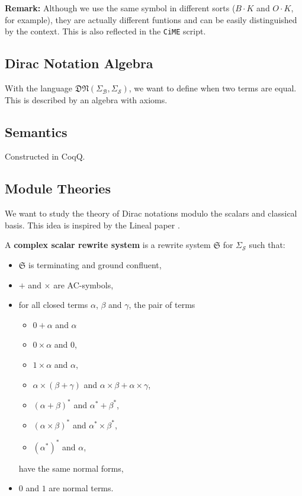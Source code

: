 \textbf{Remark: } Although we use the same symbol in different sorts ($B \cdot K$ and $O \cdot K$, for example), they are actually different funtions and can be easily distinguished by the context. This is also reflected in the \texttt{CiME} script.




\subsection{Dirac Notation Algebra}

With the language $\mathfrak{DN}(\Sigma_\mathcal{B}, \Sigma_\mathcal{S})$, we want to define when two terms are equal. This is described by an algebra with axioms.



\subsection{Semantics}
Constructed in CoqQ.

\subsection{Module Theories}

We want to study the theory of Dirac notations modulo the scalars and classical basis. This idea is inspired by the Lineal paper \cite{Arrighi2017}.

\begin{definition}
  A \textbf{complex scalar rewrite system} is a rewrite system $\mathfrak{S}$ for $\Sigma_\mathcal{S}$ such that:
  \begin{itemize}
    \item $\mathfrak{S}$ is terminating and ground confluent,
    \item $+$ and $\times$ are AC-symbols,
    \item for all closed terms $\alpha$, $\beta$ and $\gamma$, the pair of terms
      \begin{itemize}
        \item $0 + \alpha$ and $\alpha$
        \item $0 \times \alpha$ and $0$,
        \item $1 \times \alpha$ and $\alpha$,
        \item $\alpha \times (\beta + \gamma)$ and $\alpha \times \beta + \alpha \times \gamma$,
        \item $(\alpha + \beta)^*$ and $\alpha^* + \beta^*$,
        \item $(\alpha \times \beta)^*$ and $\alpha^* \times \beta^*$,
        \item $(\alpha^*)^*$ and $\alpha$,
      \end{itemize}
      have the same normal forms,
    \item $0$ and $1$ are normal terms.
  \end{itemize}
\end{definition}


